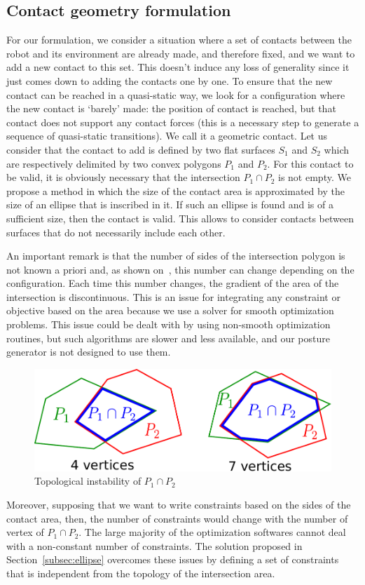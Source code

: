 \subsection{Contact geometry formulation}
\label{subsec:contact_geometry_formulation}

For our formulation, we consider a situation where a set of contacts between the robot and its environment are already made, and therefore fixed, and we want to add a new contact to this set.
This doesn't induce any loss of generality since it just comes down to adding the contacts one by one.
To ensure that the new contact can be reached in a quasi-static way, we look for a configuration where the new contact is `barely' made: the position of contact is reached, but that contact does not support any contact forces (this is a necessary step to generate a sequence of quasi-static transitions).
We call it a geometric contact.
Let us consider that the contact to add is defined by two flat surfaces $S_1$ and $S_2$ which are respectively delimited by two convex polygons $P_1$ and $P_2$.
For this contact to be valid, it is obviously necessary that the intersection $P_1 \cap P_2$ is not empty.
We propose a method in which the size of the contact area is approximated by the size of an ellipse that is inscribed in it.
If such an ellipse is found and is of a sufficient size, then the contact is valid.
This allows to consider contacts between surfaces that do not necessarily include each other.

An important remark is that the number of sides of the intersection polygon is not known a priori and, as shown on~, this number can change depending on the configuration.
Each time this number changes, the gradient of the area of the intersection is discontinuous.
This is an issue for integrating any constraint or objective based on the area because we use a solver for smooth optimization problems.
This issue could be dealt with by using non-smooth optimization routines, but such algorithms are slower and less available, and our posture generator is not designed to use them.
\begin{figure}[!htb]
  \centering
  \includegraphics[width=0.4\columnwidth]{polygon-inter.pdf}
  \caption{Topological instability of $P_1 \cap P_2$}
\label{fig:polygon-inter}
\end{figure}
Moreover, supposing that we want to write constraints based on the sides of the contact area, then, the number of constraints would change with the number of vertex of $P_1 \cap P_2$.
The large majority of the optimization softwares cannot deal with a non-constant number of constraints.
The solution proposed in Section~\ref{subsec:ellipse} overcomes these issues by defining a set of constraints that is independent from the topology of the intersection area.

